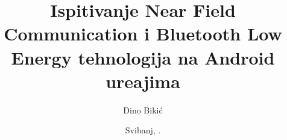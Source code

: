 


%
%
%


%




\frontmatter   %



\title{Ispitivanje Near Field Communication i Bluetooth Low Energy tehnologija na Android ure\dj ajima}   %

\date{Svibanj, \thisyear.}   %

\author{Dino Biki\'{c}}  %
\maketitle		%




\maketitleabstract

\begin{assignmentpage}
\end{assignmentpage}

\begin{honestystatementpage}
\end{honestystatementpage}

